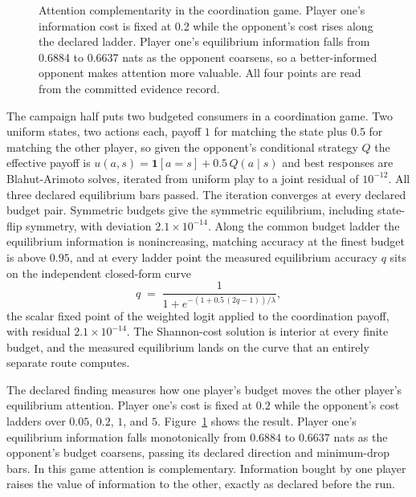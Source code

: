 \documentclass[aps,pre,reprint,nofootinbib]{revtex4-2}
\begin{document}
\begin{figure}[t]
\centering
{}
\caption{Attention complementarity in the coordination game.  Player
one's information cost is fixed at 0.2 while the opponent's cost
rises along the declared ladder.  Player one's equilibrium
information falls from 0.6884 to 0.6637 nats as the opponent
coarsens, so a better-informed opponent makes attention more
valuable.  All four points are read from the committed evidence
record.}
\label{fig:gd5}
\end{figure}

The campaign half puts two budgeted consumers in a coordination
game.  Two uniform states, two actions each, payoff $1$ for matching
the state plus $0.5$ for matching the other player, so given the
opponent's conditional strategy $Q$ the effective payoff is
$u(a,s) = \mathbf{1}[a{=}s] + 0.5\, Q(a \mid s)$ and best responses
are Blahut-Arimoto solves, iterated from uniform play to a joint
residual of $10^{-12}$.  All three declared equilibrium bars passed.
The iteration converges at every declared budget pair.  Symmetric
budgets give the symmetric equilibrium, including state-flip
symmetry, with deviation $2.1\times10^{-14}$.  Along the common
budget ladder the equilibrium information is nonincreasing, matching
accuracy at the finest budget is above $0.95$, and at every ladder
point the measured equilibrium accuracy $q$ sits on the independent
closed-form curve
\begin{equation}
  q \;=\; \frac{1}{1 + e^{-(1 + 0.5\,(2q-1))/\lambda}},
  \label{eq:fp}
\end{equation}
the scalar fixed point of the weighted logit applied to the
coordination payoff, with residual $2.1\times10^{-14}$.  The
Shannon-cost solution is interior at every finite budget, and the
measured equilibrium lands on the curve that an entirely separate
route computes.

The declared finding measures how one player's budget moves the
other player's equilibrium attention.  Player one's cost is fixed at
$0.2$ while the opponent's cost ladders over $0.05$, $0.2$, $1$, and
$5$.  Figure~\ref{fig:gd5} shows the result.  Player one's
equilibrium information falls monotonically from $0.6884$ to
$0.6637$ nats as the opponent's budget coarsens, passing its
declared direction and minimum-drop bars.  In this game attention is
complementary.  Information bought by one player raises the value of
information to the other, exactly as declared before the run.
\end{document}
